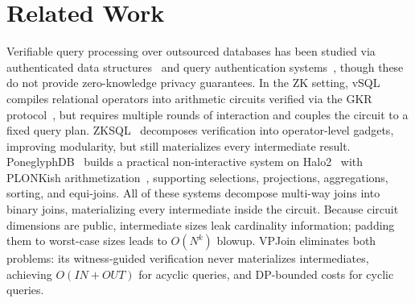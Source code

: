 \documentclass[sigconf]{acmart}
\begin{document}
\vspace{-0.1in}
\section{Related Work}
\label{sec:related_work}

Verifiable query processing over outsourced databases has been studied via authenticated data structures~\cite{tamassia2003authenticated, yang2009authenticated} and query authentication systems~\cite{zhang2015integridb, bajaj2013correctdb}, though these do not provide zero-knowledge privacy guarantees.
In the ZK setting, vSQL~\cite{zhang2017vsql,zhang2017zero} compiles relational operators into arithmetic circuits verified via the GKR protocol~\cite{goldwasser2015delegating}, but requires multiple rounds of interaction and couples the circuit to a fixed query plan. ZKSQL~\cite{li2023zksql} decomposes verification into operator-level gadgets, improving modularity, but still materializes every intermediate result. PoneglyphDB~\cite{gu2025poneglyphdb} builds a practical non-interactive system on Halo2~\cite{halo2-protocol,halo2} with PLONKish arithmetization~\cite{gabizon2019plonk}, supporting selections, projections, aggregations, sorting, and equi-joins.
All of these systems decompose multi-way joins into binary joins, materializing every intermediate inside the circuit. Because circuit dimensions are public, intermediate sizes leak cardinality information; padding them to worst-case sizes leads to $O(N^k)$ blowup. VPJoin eliminates both problems: its witness-guided verification never materializes intermediates, achieving $O(\mathit{IN} + \mathit{OUT})$ for acyclic queries, and DP-bounded costs for cyclic queries.

\end{document}
